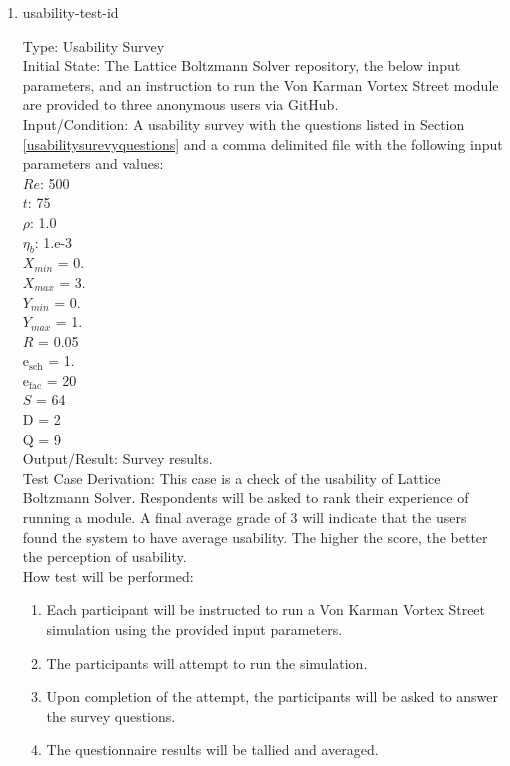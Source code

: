 \documentclass[12pt, titlepage]{article}
\newcommand{\famname}{Lattice Boltzmann Solver}
\newcounter{testcounter} %
\begin{document}
\begin{enumerate}

\item{usability-test-id\thetestcounter \\}

Type: Usability Survey\\
					
Initial State: The {\famname} repository, the below input parameters, and an
instruction to run the Von Karman Vortex Street module are provided to three
anonymous users via GitHub.\\
					
Input/Condition: A usability survey with the questions listed in Section
\ref{usabilitysurevyquestions} and a comma delimited file with the following
input parameters and values:\\
$Re$: 500\\
$t$: 75\\
$\rho$: 1.0\\
$\eta_b$: 1.e-3\\
$X_{min}$ = 0.\\
$X_{max}$ = 3.\\
$Y_{min}$ = 0.\\
$Y_{max}$ = 1.\\
$R$ = 0.05\\
$\mathrm{e_{sch}}$ = 1.\\
$\mathrm{e_{fac}}$ = 20\\
$S$ = 64\\
$\mathrm{D}$ = 2\\
$\mathrm{Q}$ = 9\\

				
Output/Result: Survey results.\\

Test Case Derivation: This case is a check of the usability of
{\famname}. Respondents will be asked to rank their experience of running a
module. A final average grade of 3 will indicate that the users found the system
to have average usability. The higher the score, the better the perception of
usability.\\
	
How test will be performed: 

\begin{enumerate}
\item Each participant will be instructed to run a Von Karman Vortex Street
simulation using the provided input parameters.
\item The participants will attempt to run the simulation.
\item Upon completion of the attempt, the participants will be asked to answer
the survey questions. 
\item The questionnaire results will be tallied and averaged.
\end{enumerate}

\end{enumerate}
\end{document}
